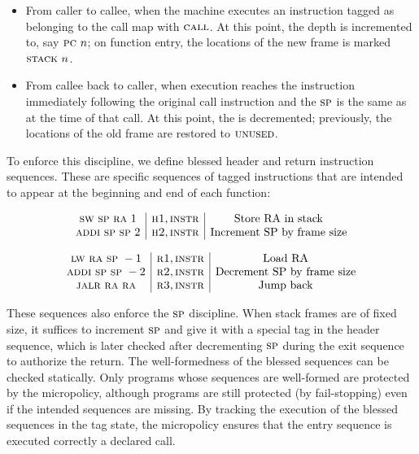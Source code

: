 \documentclass[acmsmall,review,anonymous]{acmart}\settopmatter{printfolios=true,printccs=false,printacmref=false}
\begin{document}
\begin{itemize}

\item From caller to callee, when the machine executes an instruction tagged as
  belonging to the call map with $\textsc{call}$. At this point, the {\PCname} depth
  is incremented to, say $\textsc{pc} ~ n$; on function entry, the locations of
  the new frame is marked $\textsc{stack} ~ n$.

\item From callee back to caller, when execution reaches the instruction
  immediately following the original call instruction and the $\textsc{sp}$ is the same
  as at the time of that call. At this point, the {\PCname} is decremented;
  previously, the locations of the old frame are restored to $\textsc{unused}$.

\end{itemize}

To enforce this discipline, we define blessed header and return instruction
sequences. These are specific sequences of tagged instructions that are intended
to appear at the beginning and end of each function:

\[
  \begin{array}{c|c|c}
    {\textsc{sw}~ \textsc{sp}~ \textsc{ra}~ 1} & {\textsc{h1}, \textsc{instr}} & \text{Store RA in stack} \\
    {\textsc{addi} ~ \textsc{sp} ~ \textsc{sp} ~ 2} & {\textsc{h2}, \textsc{instr}} & \text{Increment SP by frame size}
  \end{array}
  \]

\[
  \begin{array}{c|c|c}
    {\textsc{lw}~ \textsc{ra}~ \textsc{sp}~ -1} & {\textsc{r1}, \textsc{instr}} & \text{Load RA} \\
    {\textsc{addi} ~ \textsc{sp} ~ \textsc{sp} ~ -2} & {\textsc{r2}, \textsc{instr}} & \text{Decrement SP by frame size} \\
    {\textsc{jalr} ~ \textsc{ra} ~ \textsc{ra}} & {\textsc{r3}, \textsc{instr}} & \text{Jump back}
  \end{array}
\]


These sequences also enforce the $\textsc{sp}$ discipline. When stack frames are of
fixed size, it suffices to increment $\textsc{sp}$ and give it with a special tag in the
header sequence, which is later checked after decrementing $\textsc{sp}$ during the exit
sequence to authorize the return. The well-formedness of the blessed sequences
can be checked statically. Only programs whose sequences are well-formed are
protected by the micropolicy, although programs are still protected (by
fail-stopping) even if the intended sequences are missing. By tracking the
execution of the blessed sequences in the {\PCname} tag state, the micropolicy
ensures that the entry sequence is executed correctly a declared call.
\end{document}
